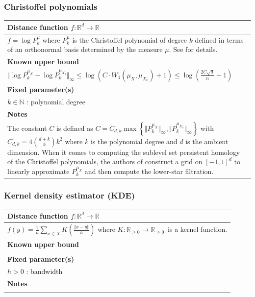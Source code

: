 \documentclass[10pt,a4paper]{article}
\theoremstyle{definition}
\newcommand{\R}{\mathbb{R}}
\begin{document}
\subsubsection{Christoffel polynomials}
\begin{tabularx}{\textwidth}{|X|}
	\hline
	\textbf{Distance function $f\colon\R^d\to\R$}  \\ \hline
	$f = \log P_k^{\mu}$ where $P_k^{\mu}$ is the Christoffel polynomial of degree $k$ defined in terms of an orthonormal basis determined by the measure $\mu$. See \autocite{Hoefgeest2022} for details.
	\\ \hline
	\textbf{Known upper bound \autocite{Hoefgeest2022}}  \\ \hline
	$\Vert\log P_k^{\mu_X}-\log P_k^{\mu_{X_0}}\Vert_\infty \leq \log(C\cdot W_1(\mu_X, \mu_{X_0}) + 1)\leq\log\left(\frac{2C\sqrt{d}}{n}+1\right)$
	\\ \hline
	\textbf{Fixed parameter(s)} \\ \hline
	$k\in\mathbb{N}$ : polynomial degree
	\\ \hline
	\textbf{Notes}              \\ \hline
	The constant $C$ is defined as $C=C_{d,k}\max\left\{\Vert P_k^{\mu_X}\Vert_\infty, \Vert P_k^{\mu_{X_0}}\Vert_\infty\right\}$ with $C_{d,k} = 4\binom{d+k}{k}k^2$ where $k$ is the polynomial degree and $d$ is the ambient dimension. When it comes to computing the sublevel set persistent homology of the Christoffel polynomials, the authors of \autocite{Hoefgeest2022} construct a grid on $[-1,1]^d$ to linearly approximate $P_k^{\mu_X}$ and then compute the lower-star filtration.
	\\ \hline
\end{tabularx}

\subsubsection{Kernel density estimator (KDE)}
\begin{tabularx}{\textwidth}{|X|}
	\hline
	\textbf{Distance function $f\colon\R^d\to\R$}  \\ \hline
	$f(y)=\frac{1}{n}\sum_{x\in X}K\left(\frac{\Vert x-y \Vert}{h}\right)$ where $K\colon\R_{\geq0}\to\R_{\geq0}$ is a kernel function.
	\\ \hline
	\textbf{Known upper bound}  \\ \hline

	\\ \hline
	\textbf{Fixed parameter(s)} \\ \hline
	$h>0$ : bandwidth
	\\ \hline
	\textbf{Notes}              \\ \hline
	\\ \hline
\end{tabularx}
\end{document}
